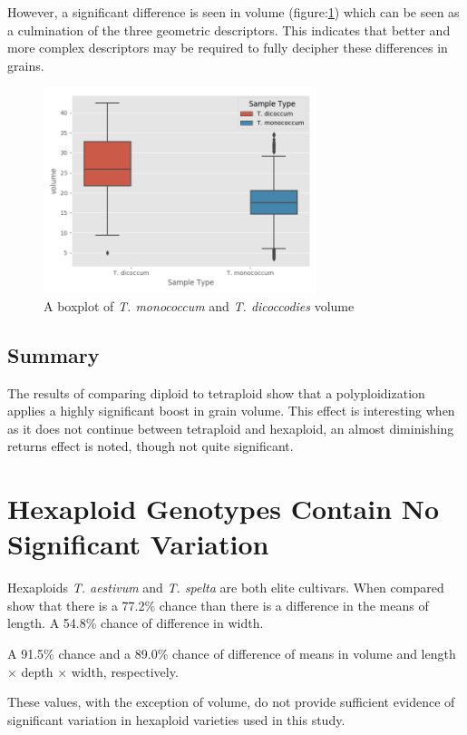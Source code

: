 \documentclass[11pt]{report}
\begin{document}
However, a significant difference is seen in volume (figure:\ref{fig:orgd72bab8}) which can be seen as a culmination of the three geometric descriptors. This indicates that better and more complex descriptors may be required to fully decipher these differences in grains.

\clearpage

\begin{figure}[htbp]
\centering
\includegraphics[width=8cm]{./images/results/group8/volume.png}
\caption{\label{fig:orgd72bab8}
A boxplot of \emph{T. monococcum} and \emph{T. dicoccodies} volume}
\end{figure}


\subsection{Summary}
\label{sec:org6a1c900}
The results of comparing diploid to tetraploid show that a polyploidization applies a highly significant boost in grain volume. This effect is interesting when as it does not continue between tetraploid and hexaploid, an almost diminishing returns effect is noted, though not quite significant.


\section{Hexaploid Genotypes Contain No Significant Variation}
\label{sec:org4477958}

Hexaploids \emph{T. aestivum} and \emph{T. spelta} are both elite cultivars. When compared show that there is a 77.2\% chance than there is a difference in the means of length. A 54.8\% chance of difference in width.

A 91.5\% chance and a 89.0\% chance of difference of means in volume and length \(\times\) depth \(\times\) width, respectively.

These values, with the exception of volume, do not provide sufficient evidence of significant variation in hexaploid varieties used in this study.
\end{document}
